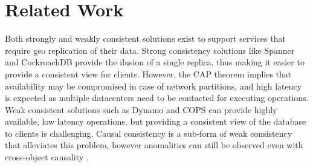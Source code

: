 \documentclass{vldb}
\newcommand{\grumbler}[2]{{\color{red}{\bf #1:} #2}}
\newcommand{\andre}[1]{\grumbler{andre}{#1}}
\begin{document}
%
%
%
%


\section{Related Work}

Both strongly and weakly consistent solutions exist to support services that require geo replication of their data.
Strong consistency solutions like Spanner \cite{spanner} and CockroachDB \cite{cockroachdb} provide the ilusion of a single replica, thus making it easier to provide a consistent view for clients.
However, the CAP theorem \cite{cap} implies that availability may be compromised in case of network partitions, and high latency is expected as multiple datacenters need to be contacted for executing operations.
Weak consistent solutions such as Dynamo \cite{dynamo} and COPS \cite{cops} can provide highly available, low latency operations, but providing a consistent view of the database to clients is challenging.
Causal consistency is a sub-form of weak consistency that alleviates this problem, however anomalities can still be observed even with cross-object causality \cite{cops, burckhardt2013understanding}.
\end{document}

